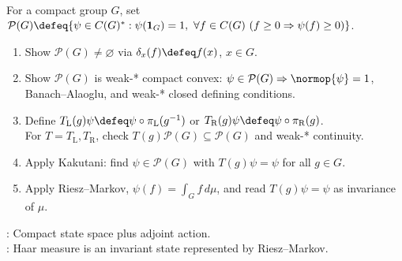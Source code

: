 \begin{method} \label{meth:kakutani-functional-fixed-point-pattern} \\
For a compact group $G$, set $\mathcal{P}(G)\defeq\{\psi\in C(G)^*:\psi(\mathbf{1}_G)=1,\ \forall f\in C(G)\ (f\geq0\Rightarrow\psi(f)\geq0)\}$.
\begin{enumerate}[label=(\roman*)]
\setlength{\itemsep}{0pt}
\item Show $\mathcal{P}(G)\neq\varnothing$ via $\delta_x(f)\defeq f(x)$, $x\in G$.
\item Show $\mathcal{P}(G)$ is weak-* compact convex: $\psi\in\mathcal{P}(G)\Rightarrow\normop{\psi}=1$,\\
Banach--Alaoglu, and weak-* closed defining conditions.
\item Define $T_{\mathrm{L}}(g)\psi\defeq\psi\circ\pi_{\mathrm{L}}(g^{-1})$ or $T_{\mathrm{R}}(g)\psi\defeq\psi\circ\pi_{\mathrm{R}}(g)$.\\
For $T=T_{\mathrm{L}},T_{\mathrm{R}}$, check $T(g)\mathcal{P}(G)\subseteq\mathcal{P}(G)$ and weak-* continuity.
\item Apply Kakutani: find $\psi\in\mathcal{P}(G)$ with $T(g)\psi=\psi$ for all $g\in G$.
\item Apply Riesz--Markov, $\psi(f)=\int_G f\,d\mu$, and read $T(g)\psi=\psi$ as invariance of $\mu$.
\end{enumerate}
: Compact state space plus adjoint action.\\
: Haar measure is an invariant state represented by Riesz--Markov.
\end{method}

